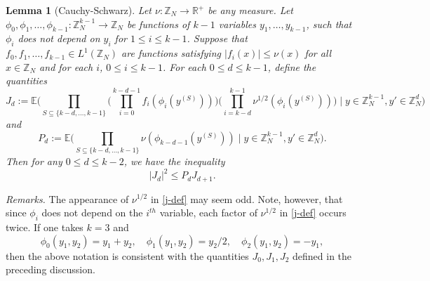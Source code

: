 \documentclass[12pt,a4paper,reqno]{amsart}
\numberwithin{equation}{section}
\theoremstyle{plain}
\newtheorem{lemma}[subsection]{Lemma}
\theoremstyle{definition}
\renewcommand{\leq}{\leqslant}
\def\Z{{\mathbb Z}}
\def\vs{\vspace{11pt}}
\begin{document}
\begin{lemma}[Cauchy-Schwarz]\label{weighted-cubes}
Let $\nu : \mathbb{Z}_N \rightarrow \mathbb{R}^+$ be any measure. Let $\phi_0,\phi_1,\dots,\phi_{k-1} : \mathbb{Z}_N^{k-1} \rightarrow \mathbb{Z}_N$ be functions of $k-1$ variables $y_1,\ldots,y_{k-1}$, such that $\phi_i$ does not depend on $y_i$ for $1 \leq i \leq k-1$. Suppose that $f_0,f_1,\dots,f_{k-1} \in L^1(\Z_N)$ are functions satisfying $|f_i(x)| \leq \nu(x)$ for all $x \in \mathbb{Z}_N$ and for each $i$, $0 \leq i \leq k-1$. For each $0 \leq d \leq k-1$, define the quantities
\begin{equation}\label{j-def}
 J_{d} :=   \mathbb{E}\bigg(\prod_{S \subseteq \{k-d,\dots,k-1\}} \big(\prod_{i = 0}^{k-d-1} f_i(\phi_i(y^{(S)}))\big) \big(\prod_{i = k-d}^{k-1} \nu^{1/2}(\phi_i (y^{(S)}))\big)\; \bigg| \; y \in \mathbb{Z}_N^{k-1}, y' \in \Z_N^d\bigg)
\end{equation}
and
\begin{equation}\label{alt-p-exp} P_d := \mathbb{E}\bigg( \prod_{S \subseteq \{k-d,\dots,k-1\}} \nu(\phi_{k-d-1}(y^{(S)})) \; \bigg| \; y \in \Z_N^{k-1}, y' \in \Z_N^d\bigg).\end{equation}
Then for any $0 \leq d \leq k-2$, we have the inequality
\begin{equation}\label{to-prove-j}
|J_{d}|^2 \leq P_d J_{d+1}.
\end{equation}
\end{lemma}

\noindent\textit{Remarks.}
The appearance of $\nu^{1/2}$ in \eqref{j-def} may seem odd. Note, however, that since $\phi_i$ does not depend on the $i^{th}$ variable, each factor of $\nu^{1/2}$ in \eqref{j-def} occurs twice. If one takes $k=3$ and 
\begin{equation}\label{phi-example}
\phi_0(y_1,y_2) = y_1+y_2, \quad \phi_1(y_1,y_2) = y_2/2, \quad \phi_2(y_1,y_2) = -y_1,
\end{equation}
then the above notation is consistent with the quantities $J_0,J_1,J_2$ defined in the preceding discussion.
\vs 
\end{document}
